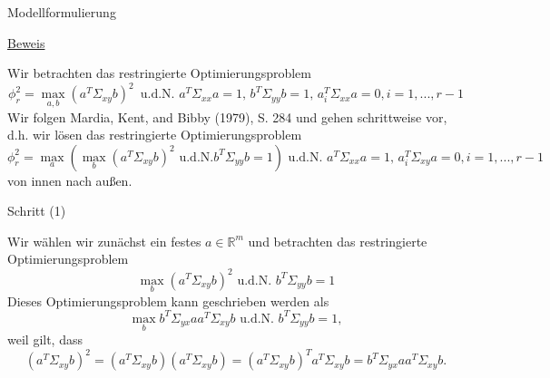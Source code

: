 \documentclass[
  8pt,
  ignorenonframetext,
]{beamer}
\begin{document}
\begin{frame}{Modellformulierung}
\protect\hypertarget{modellformulierung-5}{}
\footnotesize

\underline{Beweis}

Wir betrachten das restringierte Optimierungsproblem \tiny
\begin{equation}
\phi_r^2 = \max_{a,b} \left(a^T\Sigma_{xy}b\right)^2\,
\mbox{ u.d.N. }
a^T\Sigma_{xx}a   = 1,\,
b^T\Sigma_{yy}b   = 1,\,
a_i^T\Sigma_{xx}a = 0, i = 1,...,r-1
\end{equation} \footnotesize Wir folgen Mardia, Kent, and Bibby (1979),
S. 284 und gehen schrittweise vor, d.h. wir lösen das restringierte
Optimierungsproblem \tiny \begin{equation}
\phi_r^2 = \max_{a} \left(\max_{b} \left(a^T\Sigma_{xy}b\right)^2 \mbox{ u.d.N.} b^T\Sigma_{yy}b   = 1\right)
\mbox{ u.d.N. } a^T\Sigma_{xx}a   = 1,\, a_i^T\Sigma_{xy}a = 0,  i = 1,...,r-1
\end{equation} \footnotesize von innen nach außen.

Schritt (1)

Wir wählen wir zunächst ein festes \(a \in \mathbb{R}^m\) und betrachten
das restringierte Optimierungsproblem \begin{equation}
\max_{b} \left(a^T\Sigma_{xy}b\right)^2
\mbox{ u.d.N. }
b^T\Sigma_{yy}b   = 1
\end{equation} Dieses Optimierungsproblem kann geschrieben werden als
\begin{equation}\label{eq:kka_opt_1}
\max_{b} b^T\Sigma_{yx}aa^T\Sigma_{xy}b
\mbox{ u.d.N. }
b^T\Sigma_{yy}b = 1,
\end{equation} weil gilt, dass \begin{equation}
\left(a^T\Sigma_{xy}b\right)^2
= \left(a^T\Sigma_{xy}b\right)\left(a^T\Sigma_{xy}b\right)
= \left(a^T\Sigma_{xy}b\right)^T a^T\Sigma_{xy}b
= b^T\Sigma_{yx}aa^T\Sigma_{xy}b.
\end{equation}
\end{frame}
\end{document}
